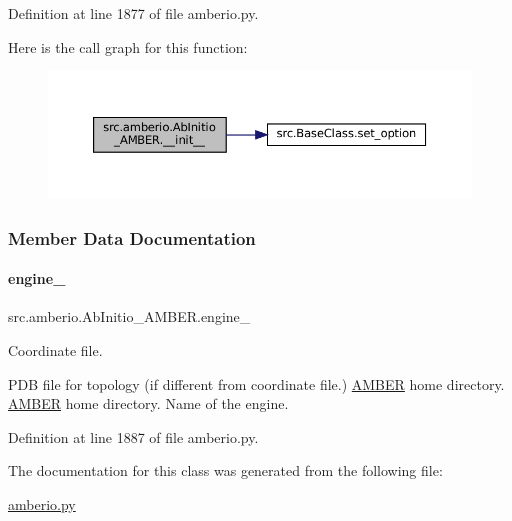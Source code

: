 Definition at line 1877 of file amberio.\+py.

Here is the call graph for this function\+:
\nopagebreak
\begin{figure}[H]
\begin{center}
\leavevmode
\includegraphics[width=350pt]{classsrc_1_1amberio_1_1AbInitio__AMBER_a3d86adb9aecf4ceae03edc43580f6639_cgraph}
\end{center}
\end{figure}


\subsubsection{Member Data Documentation}
\mbox{\label{classsrc_1_1amberio_1_1AbInitio__AMBER_acbc3213affce41994ad6bdb7453fc02f}} 
\paragraph{\texorpdfstring{engine\+\_\+}{engine\_}}
{\footnotesize\ttfamily src.\+amberio.\+Ab\+Initio\+\_\+\+A\+M\+B\+E\+R.\+engine\+\_\+}



Coordinate file. 

P\+DB file for topology (if different from coordinate file.) \hyperlink{classsrc_1_1amberio_1_1AMBER}{A\+M\+B\+ER} home directory. \hyperlink{classsrc_1_1amberio_1_1AMBER}{A\+M\+B\+ER} home directory. Name of the engine. 

Definition at line 1887 of file amberio.\+py.



The documentation for this class was generated from the following file\+:\begin{DoxyCompactItemize}
\item 
\hyperlink{amberio_8py}{amberio.\+py}\end{DoxyCompactItemize}
